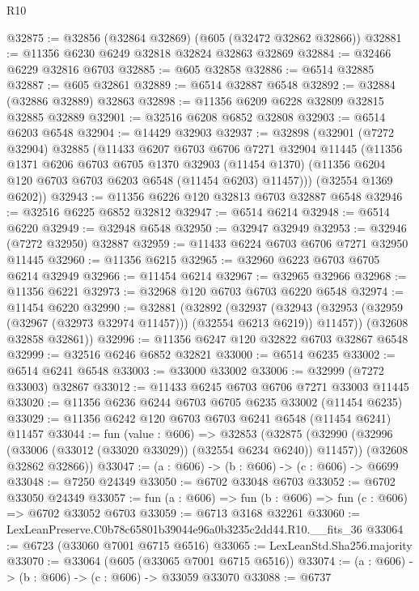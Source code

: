 \begin{lexlean}{R10}
\begin{coremodule}
@32875 := @32856 (@32864 @32869) (@605 (@32472 @32862 @32866))
@32881 := @11356 @6230 @6249 @32818 @32824 @32863 @32869
@32884 := @32466 @6229 @32816 @6703
@32885 := @605 @32858
@32886 := @6514 @32885
@32887 := @605 @32861
@32889 := @6514 @32887 @6548
@32892 := @32884 (@32886 @32889) @32863
@32898 := @11356 @6209 @6228 @32809 @32815 @32885 @32889
@32901 := @32516 @6208 @6852 @32808
@32903 := @6514 @6203 @6548
@32904 := @14429 @32903
@32937 := @32898
    (@32901
      (@7272 @32904)
      @32885
      (@11433
        @6207
        @6703
        @6706
        @7271
        @32904
        @11445
        (@11356
          @1371
          @6206
          @6703
          @6705
          @1370
          @32903
          (@11454 @1370)
          (@11356 @6204 @120 @6703 @6703 @6203 @6548 (@11454 @6203) @11457)))
      (@32554 @1369 @6202))
@32943 := @11356 @6226 @120 @32813 @6703 @32887 @6548
@32946 := @32516 @6225 @6852 @32812
@32947 := @6514 @6214
@32948 := @6514 @6220
@32949 := @32948 @6548
@32950 := @32947 @32949
@32953 := @32946 (@7272 @32950) @32887
@32959 := @11433 @6224 @6703 @6706 @7271 @32950 @11445
@32960 := @11356 @6215
@32965 := @32960 @6223 @6703 @6705 @6214 @32949
@32966 := @11454 @6214
@32967 := @32965 @32966
@32968 := @11356 @6221
@32973 := @32968 @120 @6703 @6703 @6220 @6548
@32974 := @11454 @6220
@32990 := @32881
    (@32892
      (@32937
        (@32943 (@32953 (@32959 (@32967 (@32973 @32974 @11457))) (@32554 @6213 @6219)) @11457))
      (@32608 @32858 @32861))
@32996 := @11356 @6247 @120 @32822 @6703 @32867 @6548
@32999 := @32516 @6246 @6852 @32821
@33000 := @6514 @6235
@33002 := @6514 @6241 @6548
@33003 := @33000 @33002
@33006 := @32999 (@7272 @33003) @32867
@33012 := @11433 @6245 @6703 @6706 @7271 @33003 @11445
@33020 := @11356 @6236 @6244 @6703 @6705 @6235 @33002 (@11454 @6235)
@33029 := @11356 @6242 @120 @6703 @6703 @6241 @6548 (@11454 @6241) @11457
@33044 := fun (value : @606) =>
  @32853
    (@32875
      (@32990 (@32996 (@33006 (@33012 (@33020 @33029)) (@32554 @6234 @6240)) @11457))
      (@32608 @32862 @32866))
@33047 := (a : @606) -> (b : @606) -> (c : @606) -> @6699
@33048 := @7250 @24349
@33050 := @6702 @33048 @6703
@33052 := @6702 @33050 @24349
@33057 := fun (a : @606) => fun (b : @606) => fun (c : @606) => @6702 @33052 @6703
@33059 := @6713 @3168 @32261
@33060 := LexLeanPreserve.C0b78c65801b39044e96a0b3235c2dd44.R10.__fits_36
@33064 := @6723 (@33060 @7001 @6715 @6516)
@33065 := LexLeanStd.Sha256.majority
@33070 := @33064 (@605 (@33065 @7001 @6715 @6516))
@33074 := (a : @606) -> (b : @606) -> (c : @606) -> @33059 @33070
@33088 := @6737

\end{coremodule}
\end{lexlean}
